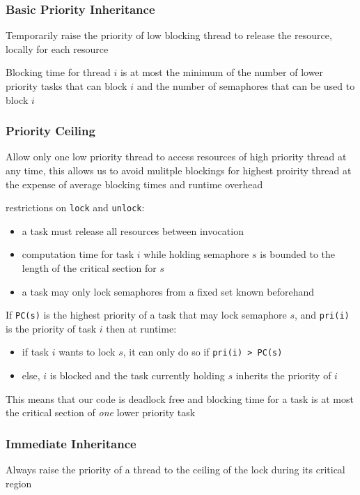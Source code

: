 \documentclass[]{article}
\theoremstyle{definition}
\begin{document}
	\subsubsection{Basic Priority Inheritance} 
	Temporarily raise the priority of low blocking thread to release the resource, locally for each resource

	Blocking time for thread $i$ is at most the minimum of the number of lower priority tasks that can block $i$ and the number of semaphores that can be used to block $i$

	\subsubsection{Priority Ceiling} 
	Allow only one low priority thread to access resources of high priority thread at any time, this allows us to avoid mulitple blockings for highest proirity thread at the expense of average blocking times and runtime overhead

	restrictions on \lstinline|lock| and \lstinline|unlock|:
	\begin{itemize}
		\item a task must release all resources between invocation
		\item computation time for task $i$ while holding semaphore $s$ is bounded to the length of the critical section for $s$
		\item a task may only lock semaphores from a fixed set known beforehand
	\end{itemize}

	If \lstinline|PC(s)| is the highest priority of a task that may lock semaphore $s$, and \lstinline|pri(i)| is the priority of task $i$ then at runtime:
	\begin{itemize}
		\item if task $i$ wants to lock $s$, it can only do so if \lstinline|pri(i) > PC(s)|
		\item else, $i$ is blocked and the task currently holding $s$ inherits the priority of $i$
	\end{itemize}


	This means that our code is deadlock free and blocking time for a task is at most the critical section of \textit{one} lower priority task

	\subsubsection{Immediate Inheritance} 
	Always raise the priority of a thread to the ceiling of the lock during its critical region
\end{document}
